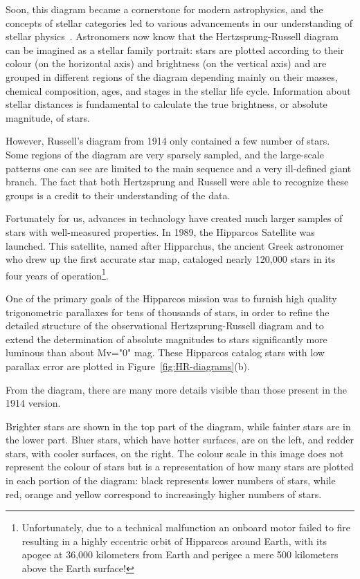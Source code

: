 Soon, this diagram became a cornerstone for modern astrophysics, and the concepts of stellar categories led to various advancements in our understanding of stellar physics~\citeme. 
Astronomers now know that the Hertzsprung-Russell diagram can be imagined as a stellar family portrait: stars are plotted according to their colour (on the horizontal axis) and brightness (on the vertical axis) and are grouped in different regions of the diagram depending mainly on their masses, chemical composition, ages, and stages in the stellar life cycle. 
Information about stellar distances is fundamental to calculate the true brightness, or absolute magnitude, of stars.

However, Russell's diagram from 1914 only contained a few number of stars.
Some regions of the diagram are very sparsely sampled, and the large-scale patterns one can see are limited to the main sequence and a very ill-defined giant branch. 
The fact that both Hertzsprung and Russell were able to recognize these groups is a credit to their understanding of the data.


Fortunately for us, advances in technology have created much larger samples of stars with well-measured properties. 
In 1989, the Hipparcos Satellite was launched. 
This satellite, named after Hipparchus, the ancient Greek astronomer who drew up the first accurate star map, cataloged nearly 120,000 stars in its four years of operation\footnote{Unfortunately, due to a technical malfunction an onboard motor failed to fire resulting in a highly eccentric orbit of Hipparcos around Earth, with its apogee at 36,000 kilometers from Earth and perigee a mere 500 kilometers above the Earth surface!}. 


One of the primary goals of the Hipparcos mission was to furnish high quality trigonometric parallaxes for tens of thousands of stars, in order to refine the detailed structure of the observational Hertzsprung-Russell diagram and to extend the determination of absolute magnitudes to stars significantly more luminous than about Mv="0" mag. 
These Hipparcos catalog stars with low parallax error are plotted in Figure~\ref{fig:HR-diagrams}(b). 

From the diagram, there are many more details visible than those present in the 1914 version. 

Brighter stars are shown in the top part of the diagram, while fainter stars are in the lower part. Bluer stars, which have hotter surfaces, are on the left, and redder stars, with cooler surfaces, on the right. 
The colour scale in this image does not represent the colour of stars but is a representation of how many stars are plotted in each portion of the diagram: black represents lower numbers of stars, while red, orange and yellow correspond to increasingly higher numbers of stars.

